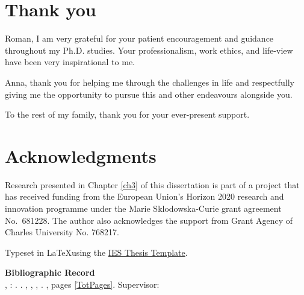 \section*{Thank you}
Roman, I am very grateful for your patient encouragement and guidance throughout my Ph.D. studies. Your professionalism, work ethics, and life-view have been very inspirational to me.

Anna, thank you for helping me through the challenges in life and respectfully giving me the opportunity to pursue this and other endeavours alongside you.

To the rest of my family, thank you for your ever-present support.

\bigskip

\section*{Acknowledgments}
Research presented in Chapter \ref{ch3} of this dissertation is part of a project that has received funding from the European Union's Horizon 2020 research and innovation programme under the Marie Sklodowska-Curie grant agreement No.\ 681228. The author also acknowledges the support from Grant Agency of Charles University No. 768217.

\vfill

\noindent Typeset in \LaTeX  using the \href{https://is.cuni.cz/studium/eng/predmety/index.php?do=predmet&kod=JEM001}{IES Thesis Template}. 

\bigskip

\noindent \textbf{Bibliographic Record} \\
\LastNameDP, \FirstNameDP: \emph{\Bookname}. \BookName. \CUNI, \FSS, \IES, \Place. \Year, pages \ref*{TotPages}. Supervisor: \Supervisor


